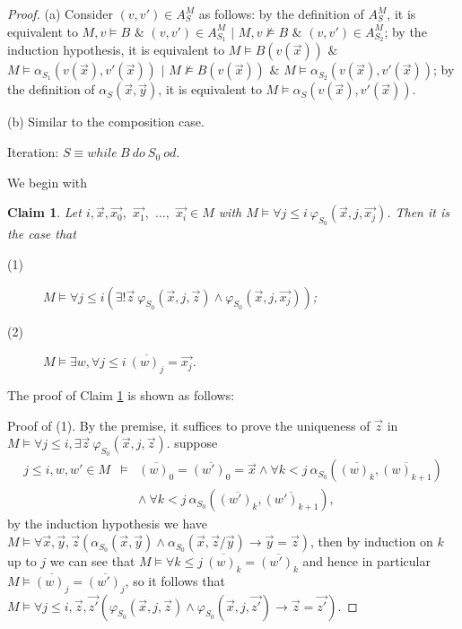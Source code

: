 \documentclass[a4paper,11pt]{article}
\begin{document}
\begin{proof}
(a) Consider $(v,v')\in A_S^M$ as follows: by the definition of $A_S^M$, it is equivalent to $M,v\models B$ $\&$ $(v,v')\in A_{S_1}^M$ $|$ $M,v\not\models B$ $\&$ $(v,v')\in A_{S_2}^M$; by the induction hypothesis, it is equivalent to $M\models B(v(\vec{x}))$ $\&$ $M \models \alpha_{S_1}(v(\vec{x}),v'(\vec{x}))$ $|$ $M\not\models B(v(\vec{x}))$ $\&$ $M \models \alpha_{S_2}(v(\vec{x}),v'(\vec{x}))$; by the definition of $\alpha_S(\vec{x},\vec{y})$, it is equivalent to $M \models \alpha_S(v(\vec{x}),v'(\vec{x}))$.

(b) Similar to the composition case.

Iteration: $S\equiv while\ B\ do\ S_0\ od$.

We begin with

\newtheorem{computable_sequence_generated_by_formulas}[X_semantics_of_while_programs]{Claim}
\begin{computable_sequence_generated_by_formulas}\label{computable_sequence_generated_by_formulas}
Let $i, \vec{x}, \vec{x_0},$ $\vec{x_1},$ $\ldots,$ $\vec{x_i} \in M$ with $M\models \forall j \leq i\ \varphi_{S_0}(\vec{x},j,\vec{x_j})$. Then it is the case that
  \begin{description}
    \item[(1)] $M\models \forall j \leq i ( \exists! \vec{z}\ \varphi_{S_0}(\vec{x},j,\vec{z}) \wedge \varphi_{S_0}(\vec{x},j,\vec{x_j}) )$;
    \item[(2)] $M\models \exists w, \forall j \leq i\ \overline{(w)_j} = \vec{x_j}$.
  \end{description}
\end{computable_sequence_generated_by_formulas}

The proof of Claim \ref{computable_sequence_generated_by_formulas} is shown as follows:

Proof of (1). By the premise, it suffices to prove the uniqueness of $\vec{z}$ in $M\models \forall j \leq i, \exists \vec{z}\ \varphi_{S_0}(\vec{x},j,\vec{z})$. suppose
\begin{eqnarray*}
  j\leq i,w,w'\in M &\models& \overline{(w)_0} = \overline{(w')_0} = \vec{x} \wedge \forall k<j\ \alpha_{S_0}(\overline{(w)_k},\overline{(w)_{k+1}}) \\
   && \wedge \: \forall k<j\ \alpha_{S_0}(\overline{(w')_k},\overline{(w')_{k+1}}),
\end{eqnarray*}
by the induction hypothesis we have $M \models \forall \vec{x},\vec{y},\vec{z}(\alpha_{S_0}(\vec{x},\vec{y})\wedge\alpha_{S_0}(\vec{x},\vec{z}/\vec{y})\rightarrow \vec{y}=\vec{z})$, then by induction on $k$ up to $j$ we can see that $M\models \forall k\leq j\ \overline{(w)_k} = \overline{(w')_k}$ and hence in particular $M\models \overline{(w)_j} = \overline{(w')_j}$, so it follows that $M\models \forall j \leq i, \vec{z},\vec{z'} ( \varphi_{S_0}(\vec{x},j,\vec{z}) \wedge \varphi_{S_0}(\vec{x},j,\vec{z'}) \rightarrow \vec{z} = \vec{z'} )$.


\end{proof}
\end{document}
